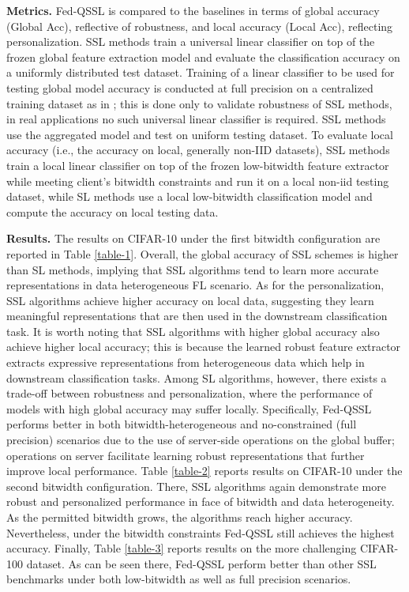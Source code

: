 {\bf Metrics.} Fed-QSSL is compared to the baselines in terms of global accuracy (Global Acc), reflective of robustness, and local accuracy (Local Acc), reflecting personalization. 
SSL methods train a universal linear classifier on top of the frozen global feature extraction model and evaluate the classification accuracy on a uniformly distributed test dataset. Training of a linear classifier to be used for testing global model accuracy is conducted at full precision on a centralized training dataset as in \cite{wang2022does}; this is done only to validate robustness of SSL methods, in real applications no such universal linear classifier is required. SSL methods use the aggregated model and test on uniform testing dataset.
To evaluate local accuracy (i.e., the accuracy on local, generally non-IID datasets), SSL methods train a local linear classifier on top of the frozen low-bitwidth feature extractor while meeting client's bitwidth constraints and run it on a local non-iid testing dataset, while SL methods use a local low-bitwidth classification model and compute the accuracy on local testing data.

{\bf Results.} The results on CIFAR-10 under the first bitwidth configuration are reported in Table \ref{table-1}. Overall, the global accuracy of SSL schemes is higher than SL methods, implying that SSL algorithms tend to learn more accurate representations in data heterogeneous FL scenario. As for the personalization, SSL algorithms achieve higher accuracy on local data, suggesting they learn meaningful representations that are then used in the downstream classification task. It is worth noting that SSL algorithms with higher global accuracy also achieve higher local accuracy; this is because the learned robust feature extractor extracts expressive representations from heterogeneous data which help in downstream classification tasks. Among SL algorithms, however, there exists a trade-off between robustness and personalization, where the performance of models with high global accuracy may suffer locally. Specifically, Fed-QSSL performs better in both bitwidth-heterogeneous and no-constrained (full precision) scenarios due to the use of server-side operations on the global buffer; operations on server facilitate learning robust representations that further improve local performance. Table \ref{table-2} reports results on CIFAR-10 under the second bitwidth configuration. There, SSL algorithms again demonstrate more robust and personalized performance in face of bitwidth and data heterogeneity. As the permitted bitwidth grows, the algorithms reach higher accuracy. Nevertheless, under the bitwidth constraints Fed-QSSL still achieves the highest accuracy. Finally, Table \ref{table-3} reports results on the more challenging CIFAR-100 dataset. As can be seen there, Fed-QSSL perform better than other SSL benchmarks under both low-bitwidth as well as full precision scenarios.

